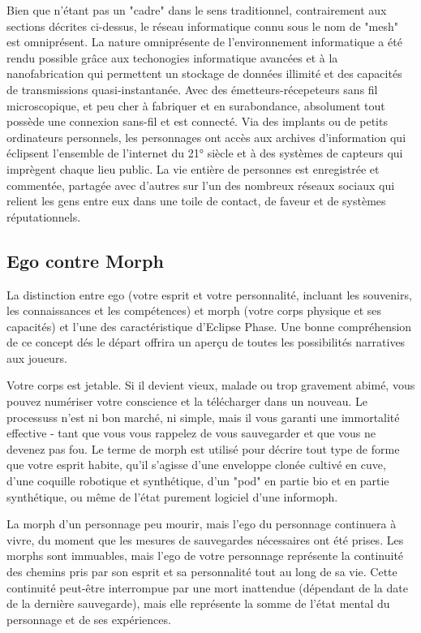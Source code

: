 Bien que n'étant pas un "cadre" dans le sens traditionnel, contrairement aux sections décrites ci-dessus, le réseau informatique connu sous le nom de "mesh" est omniprésent. La nature omniprésente de l'environnement informatique a été rendu possible grâce aux techonogies informatique avancées et à la nanofabrication qui permettent un stockage de données illimité et des capacités de transmissions quasi-instantanée. Avec des émetteurs-récepeteurs sans fil microscopique, et peu cher à fabriquer et en surabondance, absolument tout possède une connexion sans-fil et est connecté. Via des implants ou de petits ordinateurs personnels, les personnages ont accès aux archives d'information qui éclipsent l'ensemble de l'internet du 21° siècle et à des systèmes de capteurs qui imprègent chaque lieu public. La vie entière de personnes est enregistrée et commentée, partagée avec d'autres sur l'un des nombreux réseaux sociaux qui relient les gens entre eux dans une toile de contact, de faveur et de systèmes réputationnels. 



\subsection{Ego contre Morph} \label{sec:ego-vs.-morph} 

La distinction entre ego (votre esprit et votre personnalité, incluant les souvenirs, les connaissances et les compétences) et morph (votre corps physique et ses capacités) et l'une des caractéristique d'Eclipse Phase. Une bonne compréhension de ce concept dés le départ offrira un aperçu de toutes les possibilités narratives aux joueurs. 

Votre corps est jetable. Si il devient vieux, malade ou trop gravement abimé, vous pouvez numériser votre conscience et la télécharger dans un nouveau. Le processuss n'est ni bon marché, ni simple, mais il vous garanti une immortalité effective - tant que vous vous rappelez de vous sauvegarder et que vous ne devenez pas fou. Le terme de morph est utilisé pour décrire tout type de forme que votre esprit habite, qu'il s'agisse d'une enveloppe clonée cultivé en cuve, d'une coquille robotique et synthétique, d'un "pod" en partie bio et en partie synthétique, ou même de l'état purement logiciel d'une informoph. 

La morph d'un personnage peu mourir, mais l'ego du personnage continuera à vivre, du moment que les mesures de sauvegardes nécessaires ont été prises. Les morphs sont immuables, mais l'ego de votre personnage représente la continuité des chemins pris par son esprit et sa personnalité tout au long de sa vie. Cette continuité peut-être interrompue par une mort inattendue (dépendant de la date de la dernière sauvegarde), mais elle représente la somme de l'état mental du personnage et de ses expériences. 

